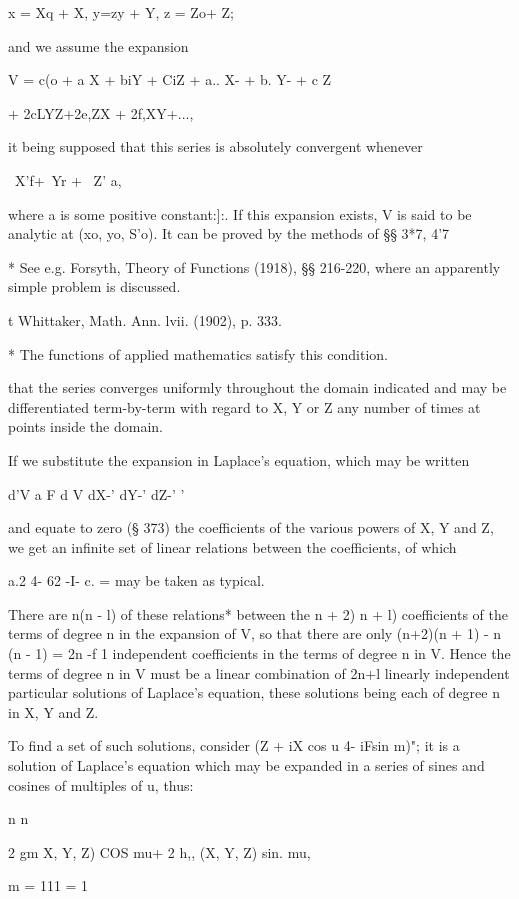 x = Xq + X, y=zy + Y, z = Zo+ Z;

and we assume the expansion

V = c(o + a X + biY + CiZ + a.. X- + b. Y- + c Z

+ 2cLYZ+2e,ZX + 2f,XY+...,

it being supposed that this series is absolutely convergent whenever

\ X'f+\ Yr + \ Z' a,

where a is some positive constant:]:. If this expansion exists, V is
said to be analytic at (xo, yo, S'o). It can be proved by the methods
of §§ 3*7, 4'7

* See e.g. Forsyth, Theory of Functions (1918), §§ 216-220, where an
apparently simple problem is discussed.

t Whittaker, Math. Ann. lvii. (1902), p. 333.

* The functions of applied mathematics satisfy this condition.

%
%

that the series converges uniformly throughout the domain indicated
and may be differentiated term-by-term with regard to X, Y or Z any
number of times at points inside the domain.

If we substitute the expansion in Laplace's equation, which may be
written

d'V a F d V dX-' dY-' dZ-' '

and equate to zero (§ 373) the coefficients of the various powers of
X, Y and Z, we get an infinite set of linear relations between the
coefficients, of which

a.2 4- 62 -I- c. = may be taken as typical.

There are n(n - l) of these relations* between the n + 2) n + l)
coefficients of the terms of degree n in the expansion of V, so that
there are only (n+2)(n + 1) - n (n - 1) = 2n -f 1 independent
coefficients in the terms of degree n in V. Hence the terms of degree
n in V must be a linear combination of 2n+l linearly independent
particular solutions of Laplace's equation, these solutions being each
of degree n in X, Y and Z.

To find a set of such solutions, consider (Z + iX cos u 4- iFsin m)";
it is a solution of Laplace's equation which may be expanded in a
series of sines and cosines of multiples of u, thus:

n n

2 gm X, Y, Z) COS mu+ 2 h,, (X, Y, Z) sin. mu,

m = 111 = 1

